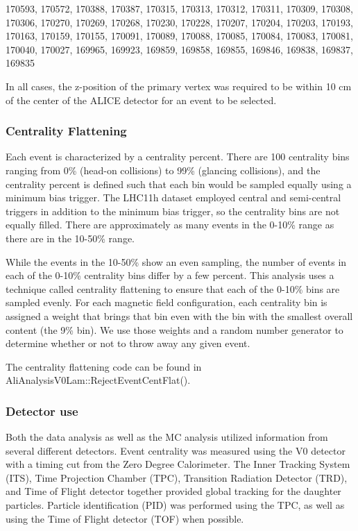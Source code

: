 170593, 170572, 170388, 170387, 170315, 170313, 170312, 170311, 170309, 170308, 170306, 170270, 170269, 170268, 170230, 170228, 170207, 170204, 170203, 170193, 170163, 170159, 170155, 170091, 170089, 170088, 170085, 170084, 170083, 170081, 170040, 170027, 169965, 169923, 169859, 169858, 169855, 169846, 169838, 169837, 169835

In all cases, the z-position of the primary vertex was required to be within 10 cm of the center of the ALICE detector for an event to be selected.  

\subsubsection{Centrality Flattening}
\label{sec:CentralityFlattening}

Each event is characterized by a centrality percent.
There are 100 centrality bins ranging from 0\%  (head-on collisions) to 99\% (glancing collisions), and the centrality percent is defined such that each bin would be sampled equally using a minimum bias trigger.
The LHC11h dataset employed central and semi-central triggers in addition to the minimum bias trigger, so the centrality bins are not equally filled.
There are approximately as many events in the 0-10\% range as there are in the 10-50\% range.

While the events in the 10-50\% show an even sampling, the number of events in each of the 0-10\% centrality bins differ by a few percent.
This analysis uses a technique called centrality flattening to ensure that each of the 0-10\% bins are sampled evenly.
For each magnetic field configuration, each centrality bin is assigned a weight that brings that bin even with the bin with the smallest overall content (the 9\% bin).
We use those weights and a random number generator to determine whether or not to throw away any given event.

The centrality flattening code can be found in AliAnalysisV0Lam::RejectEventCentFlat().


\subsubsection{Detector use}
Both the data analysis as well as the MC analysis utilized information from several different detectors.  
Event centrality was measured using the V0 detector with a timing cut from the Zero Degree Calorimeter.  
The Inner Tracking System (ITS), Time Projection Chamber (TPC), Transition Radiation Detector (TRD), and Time of Flight detector together provided global tracking for the daughter particles.  
Particle identification (PID) was performed using the TPC, as well as using the Time of Flight detector (TOF) when possible.

